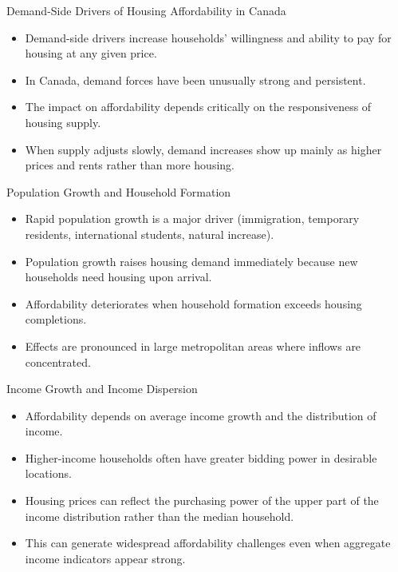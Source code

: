\documentclass[aspectratio=169]{beamer}
\begin{document}
\begin{frame}{Demand-Side Drivers of Housing Affordability in Canada}
\transfade
\begin{itemize}[<+->]
  \item Demand-side drivers increase households' willingness and ability to pay for housing at any given price.
  \item In Canada, demand forces have been unusually strong and persistent.
  \item The impact on affordability depends critically on the responsiveness of housing supply.
  \item When supply adjusts slowly, demand increases show up mainly as higher prices and rents rather than more housing.
\end{itemize}
\end{frame}

\begin{frame}{Population Growth and Household Formation}
\transfade
\begin{itemize}[<+->]
  \item Rapid population growth is a major driver (immigration, temporary residents, international students, natural increase).
  \item Population growth raises housing demand immediately because new households need housing upon arrival.
  \item Affordability deteriorates when household formation exceeds housing completions.
  \item Effects are pronounced in large metropolitan areas where inflows are concentrated.
\end{itemize}
\end{frame}

\begin{frame}{Income Growth and Income Dispersion}
\transfade
\begin{itemize}[<+->]
  \item Affordability depends on average income growth and the distribution of income.
  \item Higher-income households often have greater bidding power in desirable locations.
  \item Housing prices can reflect the purchasing power of the upper part of the income distribution rather than the median household.
  \item This can generate widespread affordability challenges even when aggregate income indicators appear strong.
\end{itemize}
\end{frame}
\end{document}

